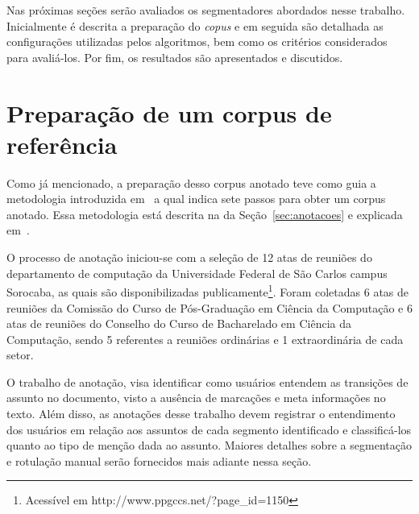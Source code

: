 Nas próximas seções serão avaliados os segmentadores abordados nesse trabalho. Inicialmente é descrita a preparação do \textit{copus} e em seguida são detalhada as configurações utilizadas pelos algoritmos, bem como os critérios considerados para avaliá-los. Por fim, os resultados são apresentados e discutidos.




\section{Preparação de um corpus de referência}




Como já mencionado, a preparação desso corpus anotado teve como guia a metodologia introduzida em~\cite{Hovy2010} a qual indica sete passos para obter um corpus anotado. Essa metodologia está descrita na da Seção~\ref{sec:anotacoes} e explicada em~\cite{Cardoso2017}. 



O processo de anotação iniciou-se com a seleção de 12 atas de reuniões do departamento de computação da Universidade Federal de São Carlos campus Sorocaba, as quais são disponibilizadas publicamente\footnote{Acessível em  http://www.ppgccs.net/?page_id=1150}. Foram coletadas 6 atas de reuniões da Comissão do Curso de Pós-Graduação em Ciência da Computação e 6 atas de reuniões do Conselho do Curso de Bacharelado em Ciência da Computação, sendo 5 referentes a reuniões ordinárias e 1 extraordinária de cada setor.

O trabalho de anotação, visa identificar como usuários entendem as transições de assunto no documento, visto a ausência de marcações e meta informações no texto. Além disso, as anotações desse trabalho devem registrar o entendimento dos usuários em relação aos assuntos de cada segmento identificado e classificá-los quanto ao tipo de menção dada ao assunto. Maiores detalhes sobre a segmentação e rotulação manual serão fornecidos mais adiante nessa seção.


